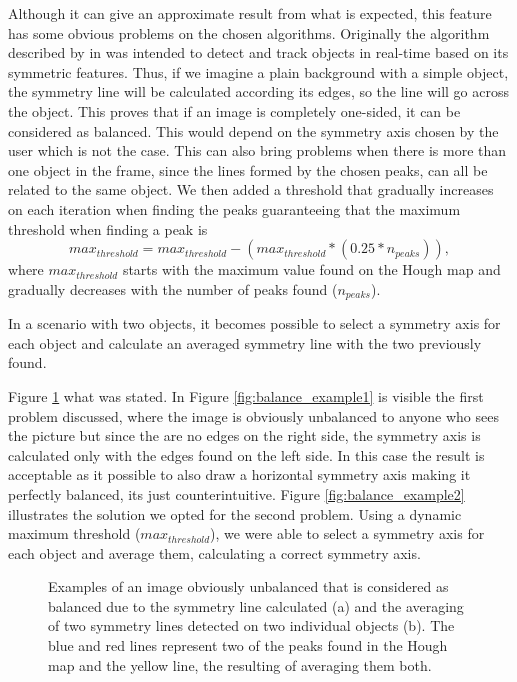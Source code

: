 Although it can give an approximate result from what is expected, this feature has some obvious problems on the chosen algorithms. Originally the algorithm described by \citeauthor{li2006real} in \cite{li2006real} was intended to detect and track objects in real-time based on its symmetric features. Thus, if we imagine a plain background with a simple object, the symmetry line will be calculated according its edges, so the line will go across the object. This proves that if an image is completely one-sided, it can be considered as balanced. This would depend on the symmetry axis chosen by the user which is not the case.
This can also bring problems when there is more than one object in the frame, since the lines formed by the chosen peaks, can all be related to the same object. We then added a threshold that gradually increases on each iteration when finding the peaks guaranteeing that the maximum threshold when finding a peak is 
\begin{equation}
	max_{threshold} = max_{threshold} - (max_{threshold}*(0.25*n_{peaks})),
\end{equation}
where $max_{threshold}$ starts with the maximum value found on the Hough map and gradually decreases with the number of peaks found ($n_{peaks}$).

In a scenario with two objects, it becomes possible to select a symmetry axis for each object and calculate an averaged symmetry line with the two previously found. 

Figure \ref{fig:image_balance_example} what was stated. In Figure \ref{fig:balance_example1} is visible the first problem discussed, where the image is obviously unbalanced to anyone who sees the picture but since the are no edges on the right side, the symmetry axis is calculated only with the edges found on the left side. In this case the result is acceptable as it possible to also draw a horizontal symmetry axis making it perfectly balanced, its just counterintuitive. Figure \ref{fig:balance_example2} illustrates the solution we opted for the second problem. Using a dynamic maximum threshold ($max_{threshold}$), we were able to select a symmetry axis for each object and average them, calculating a correct symmetry axis.

\begin{figure}[htbp]
	\centering
    \caption{Examples of an image obviously unbalanced that is considered as balanced due to the symmetry line calculated (a) and the averaging of two symmetry lines detected on two individual objects (b). The blue and red lines represent two of the peaks found in the Hough map and the yellow line, the resulting of averaging them both.}
    \label{fig:image_balance_example}
\end{figure}

